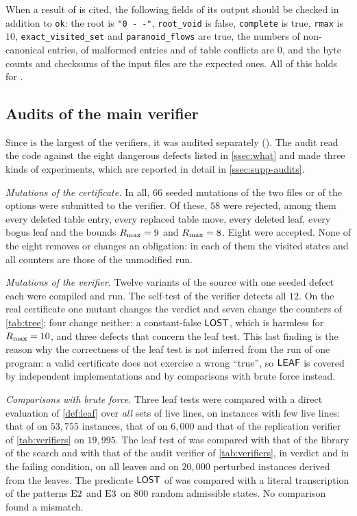 When a result of  is cited, the following fields of its output should be checked in addition
to \texttt{ok}: the root is \texttt{"0 - -"}, \texttt{root\_void} is false, \texttt{complete} is true,
\texttt{rmax} is $10$, \texttt{exact\_visited\_set} and \texttt{paranoid\_flows} are true, the numbers of
non-canonical entries, of malformed entries and of table conflicts are $0$, and the byte counts and checksums of the
input files are the expected ones. All of this holds for .

\subsection{Audits of the main verifier}\label{ssec:audits}

Since  is the largest of the verifiers, it was audited separately
(). The audit read the code against the eight dangerous defects listed in
\cref{ssec:what} and made three kinds of experiments, which are reported in detail in
\cref{ssec:supp-audits}.

\emph{Mutations of the certificate.} In all, $66$ seeded mutations of the two files or of the options were
submitted to the verifier. Of these, $58$ were rejected, among them every deleted table entry, every
replaced table move, every deleted leaf, every bogus leaf and the bounds $R_{\max}=9$ and $R_{\max}=8$. Eight
were accepted. None of the eight removes or changes an obligation: in each of them the visited states and
all counters are those of the unmodified run.

\emph{Mutations of the verifier.} Twelve variants of the source with one seeded defect each were compiled
and run. The self-test of the verifier detects all $12$. On the real certificate one mutant changes the
verdict and seven change the counters of \cref{tab:tree}; four change neither: a constant-false $\mathsf{LOST}$,
which is harmless for $R_{\max}=10$, and three defects that concern the leaf test. This last finding is the
reason why the correctness of the leaf test is not inferred from the run of one program: a valid
certificate does not exercise a wrong ``true'', so $\mathsf{LEAF}$ is covered by independent implementations and by
comparisons with brute force instead.

\emph{Comparisons with brute force.} Three leaf tests were compared with a direct evaluation of
\cref{def:leaf} over \emph{all} sets of live lines, on instances with few live lines: that of
 on $53{,}755$ instances, that of  on $6{,}000$ and that of the replication
verifier of \cref{tab:verifiers} on $19{,}995$. The leaf test of  was compared with that
of the library of the search and with that of the audit verifier of \cref{tab:verifiers}, in verdict and
in the failing condition, on all leaves and on $20{,}000$ perturbed instances derived from the leaves. The
predicate $\mathsf{LOST}$ of  was compared with a literal transcription of the patterns $\mathrm{E2}$ and
$\mathrm{E3}$ on $800$ random admissible states. No comparison found a mismatch.

